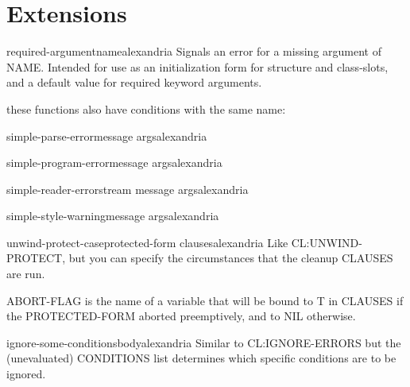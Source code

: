 \section{Extensions}
\label{sec:extensions}

\begin{function}{required-argument}{\op name}{alexandria}{}
  Signals an error for a missing argument of NAME. Intended for
use as an initialization form for structure and class-slots, and
a default value for required keyword arguments.
\end{function}

these functions also have conditions with the same name:

\begin{function}{simple-parse-error}{message \rest args}{alexandria}{}
  
\end{function}

\begin{function}{simple-program-error}{message \rest args}{alexandria}{}
  
\end{function}

\begin{function}{simple-reader-error}{stream message \rest args}{alexandria}{}
  
\end{function}

\begin{function}{simple-style-warning}{message \rest args}{alexandria}{}
  
\end{function}

\begin{macro}{unwind-protect-case}{\op protected-form \body clauses}{alexandria}{}
  Like CL:UNWIND-PROTECT, but you can specify the circumstances that
the cleanup CLAUSES are run.

ABORT-FLAG is the name of a variable that will be bound to T in
CLAUSES if the PROTECTED-FORM aborted preemptively, and to NIL
otherwise.
\end{macro}

\begin{macro}{ignore-some-conditions}{\rest \body body}{alexandria}{}
  Similar to CL:IGNORE-ERRORS but the (unevaluated) CONDITIONS
list determines which specific conditions are to be ignored.
\end{macro}
